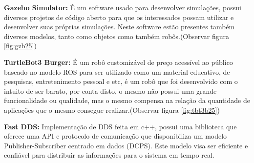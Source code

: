 
\textbf{Gazebo Simulator:} É um software usado para desenvolver simulações, possui diversos projetos de código aberto para que os interessados possam utilizar e desenvolver suas próprias simulações. Neste software estão presentes também diversos modelos, tanto como objetos como também robôs.(Observar figura \ref{fig:gzb25}) \cite{gzb2025}


\textbf{TurtleBot3 Burger:} É um robô customizável de preço acessível ao público baseado no modelo ROS para ser utilizado como um material educativo, de pesquisas, entretenimento pessoal e etc, é um robô que foi desenvolvido com o intuito de ser barato, por conta disto, o mesmo não possui uma grande funcionalidade ou qualidade, mas o mesmo compensa na relação da quantidade de aplicações que o mesmo consegue realizar.(Observar figura \ref{fig:tbt3b25}) \cite{turtlebot3_manual}

\textbf{Fast DDS:} Implementação de DDS feita em c++, possui uma biblioteca que oferece uma API e protocolo de comunicação que disponibiliza um modelo Publisher-Subscriber centrado em dados (DCPS). Este modelo visa ser eficiente e confiável para distribuir as informações para o sistema em tempo real.


